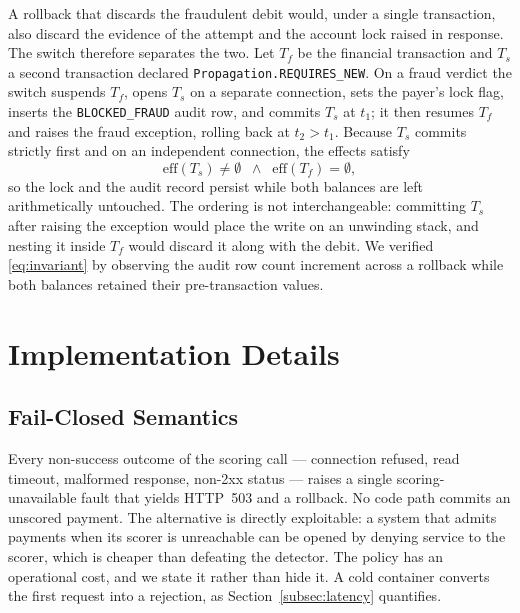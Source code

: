 \documentclass[conference]{IEEEtran}
\begin{document}
A rollback that discards the fraudulent debit would, under a single
transaction, also discard the evidence of the attempt and the account
lock raised in response. The switch therefore separates the two. Let
$T_{f}$ be the financial transaction and $T_{s}$ a second transaction
declared \texttt{Propagation.REQUIRES\_NEW}. On a fraud verdict the
switch suspends $T_{f}$, opens $T_{s}$ on a separate connection, sets
the payer's lock flag, inserts the \texttt{BLOCKED\_FRAUD} audit row,
and commits $T_{s}$ at $t_{1}$; it then resumes $T_{f}$ and raises the
fraud exception, rolling back at $t_{2} > t_{1}$. Because $T_{s}$
commits strictly first and on an independent connection, the effects
satisfy
\begin{equation}
\mathrm{eff}(T_{s}) \neq \emptyset
\;\;\wedge\;\;
\mathrm{eff}(T_{f}) = \emptyset ,
\label{eq:invariant}
\end{equation}
so the lock and the audit record persist while both balances are left
arithmetically untouched. The ordering is not interchangeable:
committing $T_{s}$ after raising the exception would place the write on
an unwinding stack, and nesting it inside $T_{f}$ would discard it
along with the debit. We verified \eqref{eq:invariant} by observing the
audit row count increment across a rollback while both balances
retained their pre-transaction values.

\section{Implementation Details}
\label{sec:implementation}

\subsection{Fail-Closed Semantics}
\label{subsec:failclosed}

Every non-success outcome of the scoring call --- connection refused,
read timeout, malformed response, non-2xx status --- raises a single
scoring-unavailable fault that yields HTTP~503 and a rollback. No code
path commits an unscored payment. The alternative is directly
exploitable: a system that admits payments when its scorer is
unreachable can be opened by denying service to the scorer, which is
cheaper than defeating the detector. The policy has an operational
cost, and we state it rather than hide it. A cold container converts
the first request into a rejection, as Section~\ref{subsec:latency}
quantifies.
\end{document}
